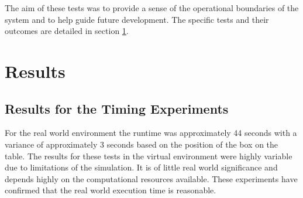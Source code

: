 \documentclass[letterpaper, 10 pt, conference]{conf/ieeeconf}  %
\begin{document}
The aim of these tests was to provide a sense of the operational boundaries of
the system and to help guide future development.
The specific tests and their outcomes are detailed in section \ref{sec:results}.
\vspace{-0.6em}


\section{Results}
\label{sec:results}

\subsection{Results for the Timing Experiments}
For the real world environment the runtime was approximately 44 seconds with a
variance of approximately 3 seconds based on the position of the box on the
table. The results for these tests in the virtual environment were highly
variable due to limitations of the simulation. It is of little real world
significance and depends highly on the computational resources available. These
experiments have confirmed that the real world execution time is reasonable.
\end{document}
